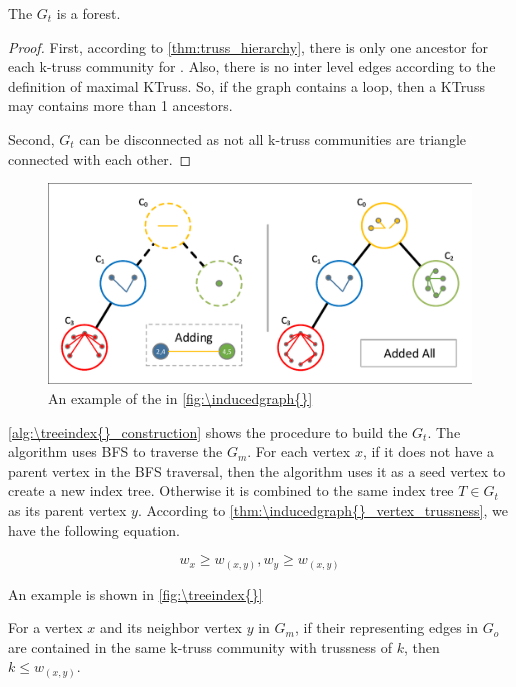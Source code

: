 \begin{Thm}
The \treeindex{} $G_t$ is a forest.
\label{thm:forest}
\end{Thm}

\begin{proof}
First, according to \autoref{thm:truss_hierarchy}, there is only one ancestor for each k-truss community for . Also, there is no inter level edges according to the definition of maximal KTruss. So, if the graph contains a loop, then a KTruss may contains more than 1 ancestors.

Second, $G_t$ can be disconnected as not all k-truss communities are triangle connected with each other. 
\end{proof}

\begin{figure}[ht]
    \centering
    \includegraphics[width=\linewidth]{./figures/tree_index.pdf}
    \caption{An example \treeindex{} of the \inducedgraph{} in \autoref{fig:\inducedgraph{}}}
    \label{fig:\treeindex{}}
\end{figure}

\autoref{alg:\treeindex{}_construction} shows the procedure to build the \treeindex{} $G_t$. The algorithm uses BFS to traverse the \inducedgraph $G_m$. For each vertex $x$, if it does not have a parent vertex in the BFS traversal, then the algorithm uses it as a seed vertex to create a new index tree. Otherwise it is combined to the same index tree $T \in G_t$ as its parent vertex $y$. According to \autoref{thm:\inducedgraph{}_vertex_trussness}, we have the following equation.

\begin{equation}
w_{x} \ge w_{(x,y)}, w_{y} \ge w_{(x,y)}
\label{equ:lowest_edge_weight}
\end{equation}

An example is shown in \autoref{fig:\treeindex{}}

\begin{Thm}
For a vertex $x$ and its neighbor vertex $y$ in \inducedgraph{} $G_m$, if their representing edges in $G_o$ are contained in the same k-truss community with trussness of $k$, then $k \le w_{(x,y)}$. 
\label{thm:k_le_edge_weight}
\end{Thm}


